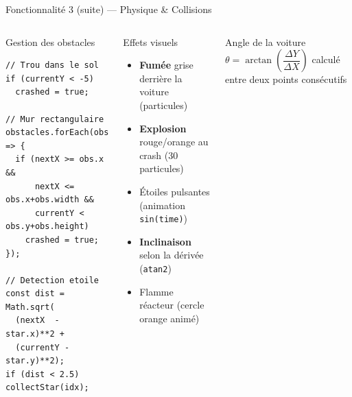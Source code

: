\documentclass[aspectratio=169,12pt]{beamer}
\newcommand{\highlight}[1]{\textcolor{myyellow}{\textbf{#1}}}
\newcommand{\success}[1]{\textcolor{mygreen}{\textbf{#1}}}
\newcommand{\danger}[1]{\textcolor{myred}{\textbf{#1}}}
\begin{document}
\begin{frame}{Fonctionnalit\'e 3 (suite) --- Physique \& Collisions}
  \begin{columns}
    \begin{block}{Gestion des obstacles}
\begin{lstlisting}
// Trou dans le sol
if (currentY < -5)
  crashed = true;

// Mur rectangulaire
obstacles.forEach(obs => {
  if (nextX >= obs.x &&
      nextX <= obs.x+obs.width &&
      currentY < obs.y+obs.height)
    crashed = true;
});

// Detection etoile
const dist = Math.sqrt(
  (nextX  - star.x)**2 +
  (currentY - star.y)**2);
if (dist < 2.5) collectStar(idx);
\end{lstlisting}
    \end{block}
    \begin{block}{Effets visuels}
      \begin{itemize}
        \item \success{Fum\'ee} grise derri\`ere la voiture (particules)
        \item \danger{Explosion} rouge/orange au crash (30 particules)
        \item \textcolor{myyellow}{\'Etoiles} pulsantes (animation \texttt{sin(time)})
        \item \highlight{Inclinaison} selon la d\'eriv\'ee (\texttt{atan2})
        \item \textcolor{mycyan}{Flamme} r\'eacteur (cercle orange anim\'e)
      \end{itemize}
    \end{block}
    \begin{exampleblock}{Angle de la voiture}
      \small $\theta = \arctan\!\left(\dfrac{\Delta Y}{\Delta X}\right)$
      calcul\'e entre deux points cons\'ecutifs
    \end{exampleblock}
  \end{columns}
\end{frame}
\end{document}
